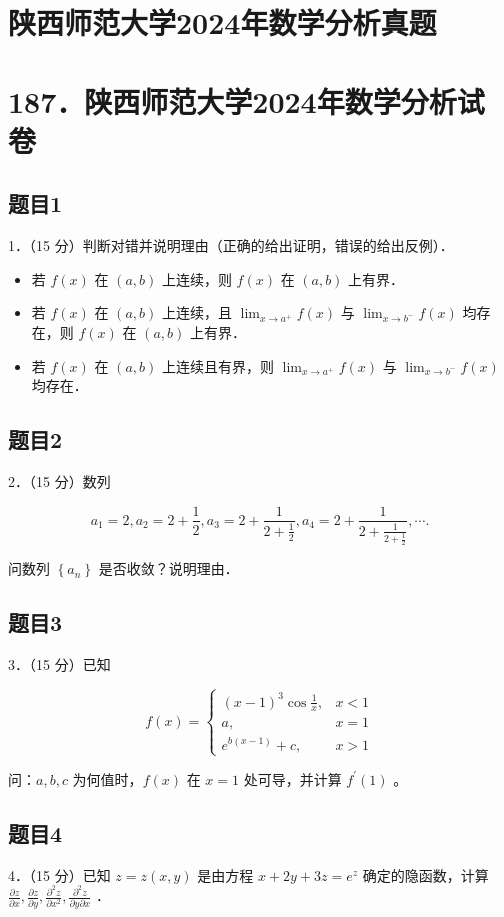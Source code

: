 \documentclass{article}
\begin{document}
\section*{陕西师范大学2024年数学分析真题}
\section*{187．陕西师范大学2024年数学分析试卷}

\subsection{题目1}
1．（15 分）判断对错并说明理由（正确的给出证明，错误的给出反例）．

\begin{itemize}
  \item[（1）] 若 \(f(x)\) 在 \((a, b)\) 上连续，则 \(f(x)\) 在 \((a, b)\) 上有界．
  \item[（2）] 若 \(f(x)\) 在 \((a, b)\) 上连续，且 \(\lim _{x \rightarrow a^{+}} f(x)\) 与 \(\lim _{x \rightarrow b^{-}} f(x)\) 均存在，则 \(f(x)\) 在 \((a, b)\) 上有界．
  \item[（3）] 若 \(f(x)\) 在 \((a, b)\) 上连续且有界，则 \(\lim _{x \rightarrow a^{+}} f(x)\) 与 \(\lim _{x \rightarrow b^{-}} f(x)\) 均存在．
\end{itemize}

\subsection{题目2}
2．（15 分）数列

\[
a_{1}=2, a_{2}=2+\frac{1}{2}, a_{3}=2+\frac{1}{2+\frac{1}{2}}, a_{4}=2+\frac{1}{2+\frac{1}{2+\frac{1}{2}}}, \cdots .
\]

问数列 \(\left\{a_{n}\right\}\) 是否收敛？说明理由．

\subsection{题目3}
3．（15 分）已知

\[
f(x)= \begin{cases}(x-1)^{3} \cos \frac{1}{x}, & x<1 \\ a, & x=1 \\ e^{b(x-1)}+c, & x>1\end{cases}
\]

问：\(a, b, c\) 为何值时，\(f(x)\) 在 \(x=1\) 处可导，并计算 \(f^{\prime}(1)\) 。

\subsection{题目4}
4．（15 分）已知 \(z=z(x, y)\) 是由方程 \(x+2 y+3 z=e^{z}\) 确定的隐函数，计算 \(\frac{\partial z}{\partial x}, \frac{\partial z}{\partial y}, \frac{\partial^{2} z}{\partial x^{2}}, \frac{\partial^{2} z}{\partial y \partial x}\) ．
\end{document}
